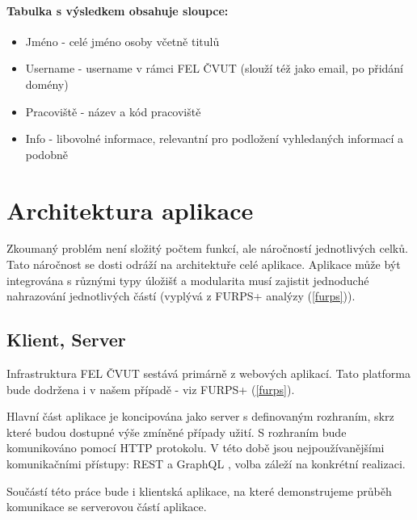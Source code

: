 \paragraph{Tabulka s výsledkem obsahuje sloupce:}
\begin{itemize}
    \item Jméno - celé jméno osoby včetně titulů
    \item Username - username v rámci FEL ČVUT (slouží též jako email, po přidání domény)
    \item Pracoviště - název a kód pracoviště
    \item Info - libovolné informace, relevantní pro podložení vyhledaných informací a podobně
\end{itemize}

\section{Architektura aplikace}
Zkoumaný problém není složitý počtem funkcí, ale náročností jednotlivých celků. Tato náročnost se dosti odráží na architektuře celé aplikace. Aplikace může být integrována s různými typy úložišť a modularita musí zajistit jednoduché nahrazování jednotlivých částí (vyplývá z FURPS+ analýzy (\ref{furps})).
\subsection{Klient, Server}
Infrastruktura FEL ČVUT sestává primárně z webových aplikací. Tato platforma bude dodržena i v našem případě - viz FURPS+ (\ref{furps}).\par
Hlavní část aplikace je koncipována jako server s definovaným rozhraním, skrz které budou dostupné výše zmíněné případy užití. S rozhraním bude komunikováno pomocí HTTP protokolu. V této době jsou nejpoužívanějšími komunikačními přístupy: REST \cite{REST} a GraphQL \cite{GRAPHQL}, volba záleží na konkrétní realizaci.\par
Součástí této práce bude i klientská aplikace, na které demonstrujeme průběh komunikace se serverovou částí aplikace.
